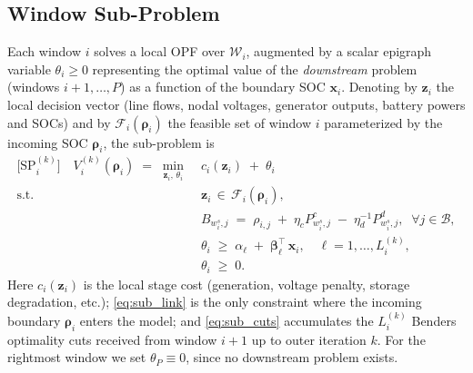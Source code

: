 \subsection{Window Sub-Problem}
\label{ssec:subproblem}

Each window $i$ solves a local OPF over $\mathcal{W}_i$, augmented by a
scalar epigraph variable $\theta_i\!\ge\!0$ representing the optimal
value of the \emph{downstream} problem (windows $i{+}1,\dots,P$) as a
function of the boundary SOC $\bm{x}_i$. Denoting by $\bm{z}_i$ the
local decision vector (line flows, nodal voltages, generator outputs,
battery powers and SOCs) and by $\mathcal{F}_i(\bm{\rho}_i)$ the
feasible set of window $i$ parameterized by the incoming SOC
$\bm{\rho}_i$, the sub-problem is
\begin{subequations}
\label{eq:subproblem}
\begin{align}
\big[\mathrm{SP}_i^{(k)}\big]\quad
V_i^{(k)}(\bm{\rho}_i) \;=\;
\min_{\bm{z}_i,\,\theta_i}\;
& c_i(\bm{z}_i)\;+\;\theta_i
\label{eq:sub_obj}\\[2pt]
\text{s.t.}\quad
& \bm{z}_i \,\in\, \mathcal{F}_i(\bm{\rho}_i),
\label{eq:sub_feas}\\[2pt]
& B_{w^{s}_i,j} \;=\; \rho_{i,j} \;+\; \eta_c P^{c}_{w^{s}_i,j}
   \;-\; \eta_d^{-1} P^{d}_{w^{s}_i,j},
   \;\;\forall j\!\in\!\mathcal{B},
\label{eq:sub_link}\\[2pt]
& \theta_i \;\ge\; \alpha_\ell \;+\; \bm{\beta}_\ell^{\!\top}\, \bm{x}_i,
   \quad \ell = 1,\dots,L_i^{(k)},
\label{eq:sub_cuts}\\[2pt]
& \theta_i \;\ge\; 0.
\label{eq:sub_thpos}
\end{align}
\end{subequations}
Here $c_i(\bm{z}_i)$ is the local stage cost (generation, voltage
penalty, storage degradation, etc.); \eqref{eq:sub_link} is the only
constraint where the incoming boundary $\bm{\rho}_i$ enters the
model; and \eqref{eq:sub_cuts} accumulates the $L_i^{(k)}$ Benders
optimality cuts received from window $i{+}1$ up to outer iteration $k$.
For the rightmost window we set $\theta_P\!\equiv\!0$, since no
downstream problem exists.

